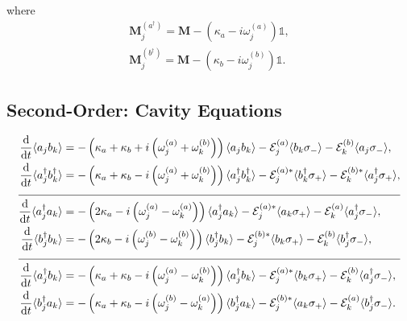 \documentclass{article}
\newcommand{\ddt}[1][]{\frac{\mathrm{d} #1}{\mathrm{d}t}}
\begin{document}
where
\begin{subequations}
	\begin{gather}
		\bm{M}^{(a^{\dagger})}_{j} = \bm{M} - \left( \kappa_{a} - i \omega_{j}^{(a)} \right) \mathbb{1}, \\
		\bm{M}^{(b^{\dagger})}_{j} = \bm{M} - \left( \kappa_{b} - i \omega_{j}^{(b)} \right) \mathbb{1}.
	\end{gather}
\end{subequations}

\subsection{Second-Order: Cavity Equations}

\begin{subequations}
	\begin{align}
		\ddt \langle a_{j} b_{k} \rangle &= -\left( \kappa_{a} + \kappa_{b} + i \left( \omega_{j}^{(a)} + \omega_{k}^{(b)} \right) \right) \langle a_{j} b_{k} \rangle - \mathcal{E}_{j}^{(a)} \langle b_{k} \sigma_{-} \rangle - \mathcal{E}_{k}^{(b)} \langle a_{j} \sigma_{-} \rangle, \\
		\ddt \langle a^{\dagger}_{j} b^{\dagger}_{k} \rangle &= -\left( \kappa_{a} + \kappa_{b} - i \left( \omega_{j}^{(a)} + \omega_{k}^{(b)} \right) \right) \langle a^{\dagger}_{j} b^{\dagger}_{k} \rangle - \mathcal{E}_{j}^{(a) *} \langle b^{\dagger}_{k} \sigma_{+} \rangle - \mathcal{E}_{k}^{(b) *} \langle a^{\dagger}_{j} \sigma_{+} \rangle, \\
		\cline{1-2}
		\ddt \langle a^{\dagger}_{j} a_{k} \rangle &= -\left( 2 \kappa_{a} - i \left( \omega_{j}^{(a)}- \omega_{k}^{(a)} \right) \right) \langle a^{\dagger}_{j} a_{k} \rangle - \mathcal{E}_{j}^{(a) *} \langle a_{k} \sigma_{+} \rangle - \mathcal{E}_{k}^{(a)} \langle a^{\dagger}_{j} \sigma_{-} \rangle, \\
		\ddt \langle b^{\dagger}_{j} b_{k} \rangle &= -\left( 2 \kappa_{b} - i \left( \omega_{j}^{(b)}- \omega_{k}^{(b)} \right) \right) \langle b^{\dagger}_{j} b_{k} \rangle - \mathcal{E}_{j}^{(b) *} \langle b_{k} \sigma_{+} \rangle - \mathcal{E}_{k}^{(b)} \langle b^{\dagger}_{j} \sigma_{-} \rangle, \\
		\cline{1-2}
		\ddt \langle a^{\dagger}_{j} b_{k} \rangle &= -\left( \kappa_{a} + \kappa_{b} - i \left( \omega_{j}^{(a)}- \omega_{k}^{(b)} \right) \right) \langle a^{\dagger}_{j} b_{k} \rangle - \mathcal{E}_{j}^{(a) *} \langle b_{k} \sigma_{+} \rangle - \mathcal{E}_{k}^{(b)} \langle a^{\dagger}_{j} \sigma_{-} \rangle, \\
		\ddt \langle b^{\dagger}_{j} a_{k} \rangle &= -\left( \kappa_{a} + \kappa_{b} - i \left( \omega_{j}^{(b)}- \omega_{k}^{(a)} \right) \right) \langle b^{\dagger}_{j} a_{k} \rangle - \mathcal{E}_{j}^{(b) *} \langle a_{k} \sigma_{+} \rangle - \mathcal{E}_{k}^{(a)} \langle b^{\dagger}_{j} \sigma_{-} \rangle.
	\end{align}
\end{subequations}
\end{document}
